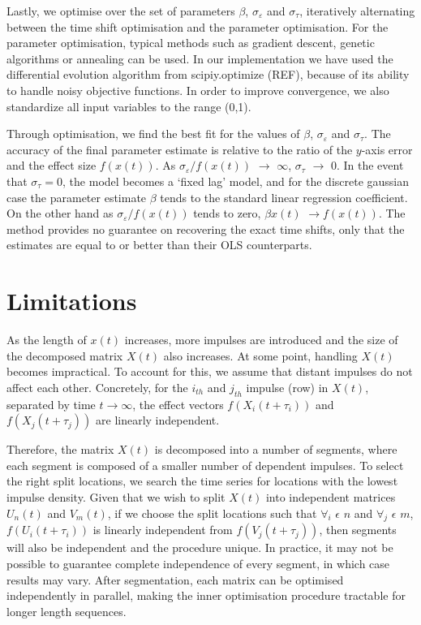 \documentclass[11pt]{amsart}
\begin{document}
Lastly, we optimise over the set of parameters $\beta$, $\sigma_{\varepsilon}$ and $\sigma_{\tau}$, iteratively alternating between the time shift optimisation and the parameter optimisation. For the parameter optimisation, typical methods such as gradient descent, genetic algorithms or annealing can be used.  In our implementation we have used the differential evolution algorithm from scipiy.optimize (REF), because of its ability to handle noisy objective functions. In order to improve convergence, we also standardize all input variables to the range (0,1).

Through optimisation, we find the best fit for the values of $\beta$, $\sigma_{\varepsilon}$ and $\sigma_{\tau}$. The accuracy of the final parameter estimate is relative to the ratio of the $y$-axis error and the effect size $f(x(t))$. As $\sigma_{\varepsilon}/f(x(t))$ $\rightarrow$ $\infty$, $\sigma_{\tau}$ $\rightarrow$ $0$. In the event that $\sigma_{\tau}=0$, the model becomes a ‘fixed lag’ model, and for the discrete gaussian case the parameter estimate $\beta$ tends to the standard linear regression coefficient.
On the other hand as $\sigma_{\varepsilon}/f(x(t))$ tends to zero, $\beta x(t)$ $\rightarrow f(x(t))$. The method provides no guarantee on recovering the exact time shifts, only that the estimates are equal to or better than their OLS counterparts.

\section{Limitations}
As the length of $x(t)$ increases, more impulses are introduced and the size of the decomposed matrix $X(t)$ also increases. At some point, handling $X(t)$ becomes impractical. To account for this, we assume that distant impulses do not affect each other. Concretely, for the $i_{th}$ and $j_{th}$ impulse (row) in $X(t)$, separated by time $t \rightarrow \infty$, the effect vectors $f(X_i(t + \tau_i))$ and $f(X_j(t + \tau_j))$ are linearly independent.

Therefore, the matrix $X(t)$ is decomposed into a number of segments, where each segment is 
composed of a smaller number of dependent impulses. To select the right split locations, we search the time series for locations with the lowest impulse density. Given that we wish to split $X(t)$ into independent matrices $U_n(t)$ and $V_m(t)$, 
if we choose the split locations such that $\forall_i$ $\epsilon$ $n$ and  $\forall_j$ $\epsilon$ $m$, 
$f(U_i(t + \tau_i))$ is linearly independent from $f(V_j(t + \tau_j))$, 
then segments will also be independent and the procedure unique. 
In practice, it may not be possible to guarantee complete independence of every segment, 
in which case results may vary. After segmentation, each matrix can be optimised independently 
in parallel, making the inner optimisation procedure tractable for longer length sequences. 
\end{document}
